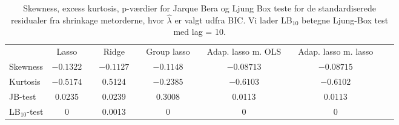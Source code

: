 \begin{sidewaystable}
\center
\begin{tabular}{lccccccccccc} 
\toprule
& Lasso && Ridge &&Group lasso &  & Adap. lasso m. OLS && Adap. lasso m. lasso  \\
Skewness &$-0.1322$ && $-0.1127$ && $-0.1148$ & & $-0.08713$ && $-0.08715$ \\
Kurtosis & $-0.5174$ && 0.5124 &&$-0.2385$ && $-0.6103$ && $-0.6102$\\
JB-test & 0.0235 && 0.0239 && 0.3008   &&   0.0113 &&$0.0113$\\
LB$_{10}$-test & 0 &&  0.0013 && 0  &  & 0 &&  0 \\  \bottomrule
 \end{tabular}
\caption{Skewness, excess kurtosis, p-værdier for Jarque Bera og Ljung Box teste for de standardiserede residualer fra shrinkage metorderne, hvor  $\widehat{\lambda}$ er valgt udfra BIC. Vi lader LB$_{10}$ betegne Ljung-Box test med lag = 10. } \label{tab:res_shrinkage_bic_tab}
\end{sidewaystable}